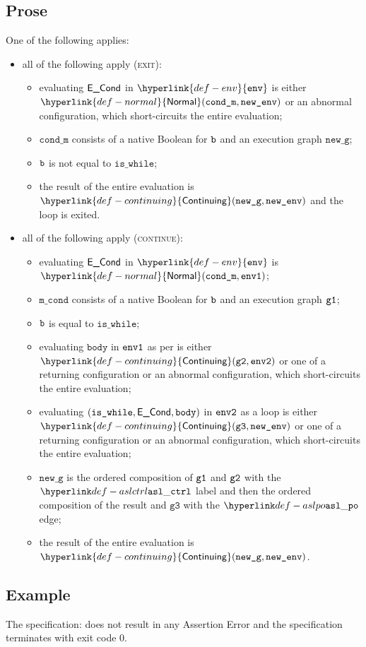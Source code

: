 \documentclass{book}
\newcommand\ProseOrAbnormal[0]{or an abnormal configuration, which short-circuits the entire evaluation}
\newcommand\Normal[0]{\hyperlink{def-normal}{\textsf{Normal}}}
\newcommand\Continuing[0]{\hyperlink{def-continuing}{\textsf{Continuing}}}
\newcommand\env[0]{\hyperlink{def-env}{\texttt{env}}}
\newcommand\newg[0]{\texttt{new\_g}}
\newcommand\vgthree[0]{\texttt{g3}}
\newcommand\mcond[0]{\texttt{m\_cond}}
\newcommand\vbody[0]{\texttt{body}}
\newcommand\iswhile[0]{\texttt{is\_while}}
\newcommand\econd[0]{\ECond}
\newcommand\condm[0]{\texttt{cond\_m}}
\begin{document}
\subsection{Prose}
One of the following applies:
\begin{itemize}
\item all of the following apply (\textsc{exit}):
  \begin{itemize}
    \item evaluating $\econd$ in $\env$ is either $\Normal(\condm, \newenv)$ \ProseOrAbnormal;
    \item $\condm$ consists of a native Boolean for $\texttt{b}$ and an execution graph $\newg$;
    \item $\texttt{b}$ is not equal to $\iswhile$;
    \item the result of the entire evaluation is $\Continuing(\newg, \newenv)$
    and the loop is exited.
  \end{itemize}
\item all of the following apply (\textsc{continue}):
  \begin{itemize}
    \item evaluating $\econd$ in $\env$ is $\Normal(\condm, \envone)$;
    \item $\mcond$ consists of a native Boolean for $\texttt{b}$ and an execution graph $\texttt{g1}$;
    \item $\texttt{b}$ is equal to $\iswhile$;
    \item evaluating $\vbody$ in $\texttt{env1}$ as per  is either
    $\Continuing(\vgtwo, \envtwo)$ or one of a returning configuration or an abnormal
    configuration, which short-circuits the entire evaluation;
    \item evaluating $(\iswhile, \econd, \vbody)$ in $\texttt{env2}$ as a loop is either \\
    $\Continuing(\vgthree, \newenv)$ or one of a returning configuration or an abnormal
    configuration, which short-circuits the entire evaluation;
    \item $\newg$ is the ordered composition of $\texttt{g1}$ and $\texttt{g2}$ with the $\aslctrl$ label
    and then the ordered composition of the result and $\vgthree$ with the $\aslpo$ edge;
    \item the result of the entire evaluation is $\Continuing(\newg, \newenv)$.
  \end{itemize}
\end{itemize}

    \subsection{Example}
    The specification:
    does not result in any Assertion Error and the specification terminates with exit
    code $0$.
\end{document}
